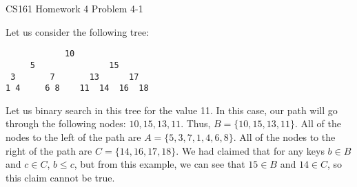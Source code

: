 \documentclass[12pt]{article}
\begin{document}
\begin{center}
{\Large CS161 Homework 4 Problem 4-1}

\end{center}
Let us consider the following tree:
\begin{verbatim}
            10
     5               15
 3       7       13      17
1 4     6 8    11  14  16  18
\end{verbatim}
Let us binary search in this tree for the value 11. In this case, our path will go through the following nodes: $10, 15, 13, 11$. Thus, $B = \{10, 15, 13, 11\}$. All of the nodes to the left of the path are $A = \{5, 3, 7, 1, 4, 6, 8\}$. All of the nodes to the right of the path are $C = \{14, 16, 17, 18\}$. We had claimed that for any keys $b \in B$ and $c \in C$, $b \le c$, but from this example, we can see that $15 \in B$ and $14 \in C$, so this claim cannot be true. 
\end{document}
